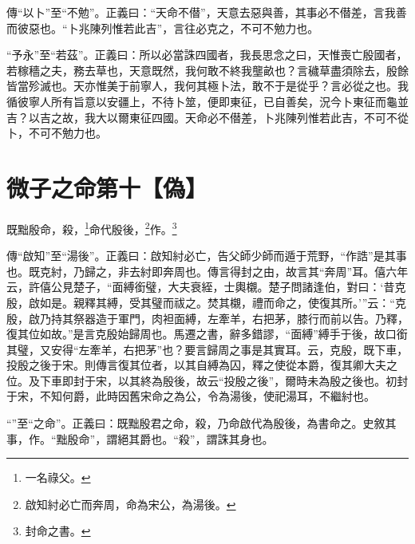 {\noindent\zhuan{}\fzbyks 傳“以卜”至“不勉”。正義曰：“天命不僣”，天意去惡與善，其事必不僣差，言我善而彼惡也。“卜兆陳列惟若此吉”，言往必克之，不可不勉力也。 \par}

{\noindent\shu{}\fzkt “予永”至“若茲”。正義曰：所以必當誅四國者，我長思念之曰，天惟喪亡殷國者，若稼穡之夫，務去草也，天意既然，我何敢不終我壟畝也？言穢草盡須除去，殷餘皆當殄滅也。天亦惟美于前寧人，我何其極卜法，敢不于是從乎？言必從之也。我循彼寧人所有旨意以安疆上，不待卜筮，便即東征，已自善矣，況今卜東征而龜並吉？以吉之故，我大以爾東征四國。天命必不僣差，卜兆陳列惟若此吉，不可不從卜，不可不勉力也。 \par}

\section{微子之命第十【偽】}


既黜殷命，殺，\footnote{一名祿父。}命代殷後，\footnote{啟知紂必亡而奔周，命為宋公，為湯後。}作。\footnote{封命之書。}


{\noindent\zhuan{}\fzbyks 傳“啟知”至“湯後”。正義曰：啟知紂必亡，告父師少師而遁于荒野，“作誥”是其事也。既克紂，乃歸之，非去紂即奔周也。傳言得封之由，故言其“奔周”耳。僖六年云，許僖公見楚子，“面縛銜璧，大夫衰絰，士輿櫬。楚子問諸逢伯，對曰：‘昔克殷，啟如是。親釋其縛，受其璧而祓之。焚其櫬，禮而命之，使復其所。’”云：“克殷，啟乃持其祭器造于軍門，肉袒面縛，左牽羊，右把茅，膝行而前以告。乃釋，復其位如故。”是言克殷始歸周也。馬遷之書，辭多錯謬，“面縛”縛手于後，故口銜其璧，又安得“左牽羊，右把茅”也？要言歸周之事是其實耳。云，克殷，既下車，投殷之後于宋。則傳言復其位者，以其自縛為囚，釋之使從本爵，復其卿大夫之位。及下車即封于宋，以其終為殷後，故云“投殷之後”，爾時未為殷之後也。初封于宋，不知何爵，此時因舊宋命之為公，令為湯後，使祀湯耳，不繼紂也。 \par}

{\noindent\shu{}\fzkt “”至“之命”。正義曰：既黜殷君之命，殺，乃命啟代為殷後，為書命之。史敘其事，作。“黜殷命”，謂絕其爵也。“殺”，謂誅其身也。 \par}


